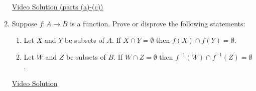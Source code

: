 \begin{enumerate}
	\href{https://youtu.be/A6m4O8GvGy8}{Video Solution (parts (a)-(c))}


	\item Suppose $f:A\to B$ is a function. Prove or disprove the following statements:
	\begin{enumerate}
    \item Let $X$ and $Y$ be subsets of $A$. If $X\cap Y=\emptyset$ then $f(X)\cap f(Y)=\emptyset$.
    \item Let $W$ and $Z$ be subsets of $B$. If $W\cap Z=\emptyset$ then $f^{-1}(W)\cap f^{-1}(Z)=\emptyset$. 
	\end{enumerate}

	\href{https://youtu.be/pVmf28Cg_Y8}{Video Solution}
\end{enumerate}